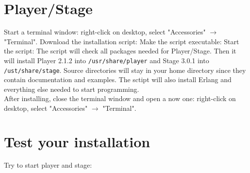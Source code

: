 \documentclass[a4paper,11pt,dvips]{article}
\begin{document}
\section{Player/Stage}
Start a terminal window: right-click on desktop, select "Accessories" $\to$ "Terminal". Download the installation script:
Make the script executable:
Start the script:
The script will check all packages needed for Player/Stage. Then it will install Player 2.1.2 into \texttt{/usr/share/player} and Stage 3.0.1 into \texttt{/ust/share/stage}. Source directories will stay in your home directory since they contain documentation and examples. The sctipt will also install Erlang and everything else needed to start programming.
\\
After installing, close the terminal window and open a now one: right-click on desktop, select "Accessories" $\to$ "Terminal".

\section{Test your installation}
Try to start player and stage:
\end{document}
